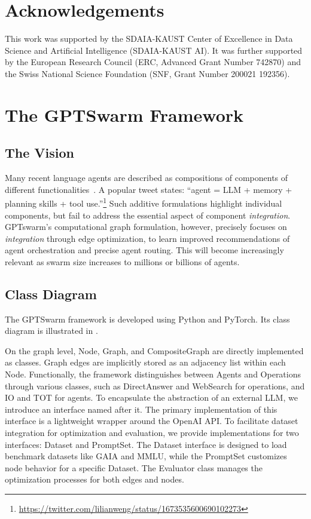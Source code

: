 \documentclass{article}
\theoremstyle{plain}
\theoremstyle{definition}
\theoremstyle{remark}
\begin{document}
\section*{Acknowledgements}
This work was supported by the SDAIA-KAUST Center of Excellence in Data Science and Artificial Intelligence (SDAIA-KAUST AI).
It was further supported by the European Research Council (ERC, Advanced Grant Number 742870) and the Swiss National Science Foundation (SNF, Grant Number 200021 192356).




\newpage
\appendix
\onecolumn
\section{The GPTSwarm Framework}\label{apendix:gptswarm_engineering}

\subsection{The Vision}
Many recent language agents are described as compositions of components of different functionalities~\citep{wang2023survey}. A popular tweet states: ``agent = LLM + memory + planning skills + tool use.''\footnote{\href{https://twitter.com/lilianweng/status/1673535600690102273}{https://twitter.com/lilianweng/status/1673535600690102273}}
Such additive formulations highlight individual components, but fail to address the essential aspect of component {\em integration}. GPTswarm's computational graph formulation, however, precisely focuses on {\em integration} through edge optimization, to learn improved recommendations of agent orchestration and precise agent routing. This will become increasingly relevant as swarm size increases to millions or billions of agents.

\subsection{Class Diagram}
The GPTSwarm framework is developed using Python and PyTorch.
Its class diagram is illustrated in .

On the graph level, Node, Graph, and CompositeGraph are directly implemented as classes.
Graph edges are implicitly stored as an adjacency list within each Node.
Functionally, the framework distinguishes between Agents and Operations through various classes, such as DirectAnswer and WebSearch for operations, and IO and TOT for agents.
To encapsulate the abstraction of an external LLM, we introduce an interface named after it.
The primary implementation of this interface is a lightweight wrapper around the OpenAI API.
To facilitate dataset integration for optimization and evaluation, we provide implementations for two interfaces: Dataset and PromptSet.
The Dataset interface is designed to load benchmark datasets like GAIA and MMLU, while the PromptSet customizes node behavior for a specific Dataset.
The Evaluator class manages the optimization processes for both edges and nodes.
\end{document}
